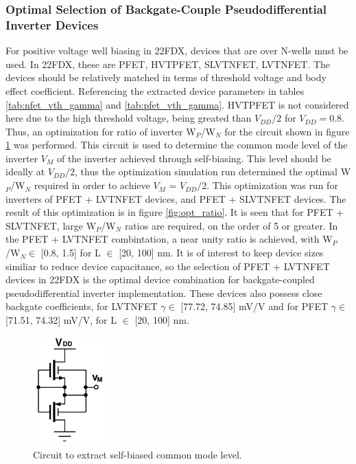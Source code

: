 		\FloatBarrier\subsubsection{Optimal Selection of Backgate-Couple Pseudodifferential Inverter Devices}
		For positive voltage well biasing in 22FDX, devices that are over N-wells must be used. In 22FDX, these are PFET, HVTPFET, SLVTNFET, LVTNFET. The devices should be relatively matched in terms of threshold voltage and body effect coefficient. Referencing the extracted device parameters in tables \ref{tab:nfet_vth_gamma} and \ref{tab:pfet_vth_gamma}. HVTPFET is not considered here due to the high threshold voltage, being greated than $V_{DD}/2$ for $V_{DD}=0.8$. Thus, an optimization for ratio of inverter W$_P$/W$_N$ for the circuit shown in figure \ref{fig:inv_vm} was performed. This circuit is used to determine the common mode level of the inverter $V_{M}$ of the inverter achieved through self-biasing. This level should be ideally at $V_{DD}/2$, thus the optimization simulation run determined the optimal W$_P$/W$_N$ required in order to achieve $V_{M}$ = $V_{DD}/2$. This optimization was run for inverters of PFET + LVTNFET devices, and PFET + SLVTNFET devices. The result of this optimization is in figure \ref{fig:opt_ratio}. It is seen that for PFET + SLVTNFET, large W$_P$/W$_N$ ratios are required, on the order of 5 or greater. In the PFET + LVTNFET combintation, a near unity ratio is achieved, with W$_P$/W$_N \in$ [0.8, 1.5] for L $\in$ [20, 100] nm. It is of interest to keep device sizes similiar to reduce device capacitance, so the selection of PFET + LVTNFET devices in 22FDX is the optimal device combination for backgate-coupled pseudodifferential inverter implementation. These devices also possess close backgate coefficients, for LVTNFET $\gamma \in$ [77.72, 74.85] mV/V and for PFET $\gamma \in$ [71.51, 74.32] mV/V, for L $\in$ [20, 100] nm. 

			\begin{figure}[htb!]
			        \centering
			        \includegraphics[width=0.25\textwidth, angle=0]{./figs/design/inv_vm}
			    \caption{Circuit to extract self-biased common mode level.}
			    \label{fig:inv_vm}
			\end{figure}

